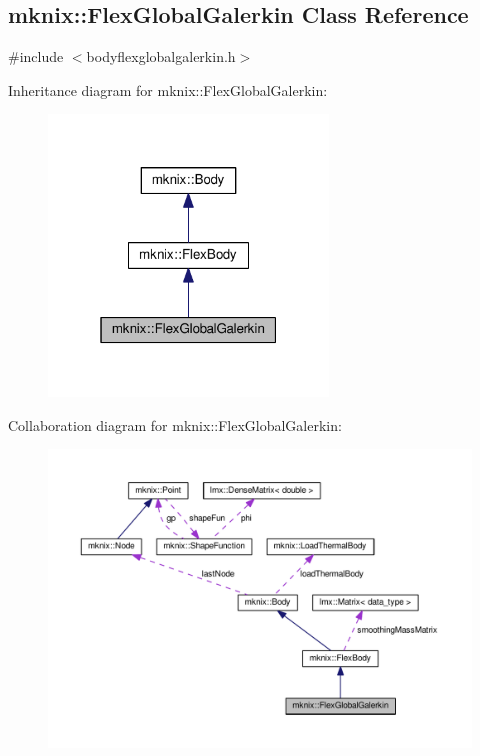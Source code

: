 \hypertarget{classmknix_1_1_flex_global_galerkin}{}\subsection{mknix\+:\+:Flex\+Global\+Galerkin Class Reference}
\label{classmknix_1_1_flex_global_galerkin}


{\ttfamily \#include $<$bodyflexglobalgalerkin.\+h$>$}



Inheritance diagram for mknix\+:\+:Flex\+Global\+Galerkin\+:\nopagebreak
\begin{figure}[H]
\begin{center}
\leavevmode
\includegraphics[width=211pt]{d2/d2f/classmknix_1_1_flex_global_galerkin__inherit__graph}
\end{center}
\end{figure}


Collaboration diagram for mknix\+:\+:Flex\+Global\+Galerkin\+:\nopagebreak
\begin{figure}[H]
\begin{center}
\leavevmode
\includegraphics[width=350pt]{dd/ddb/classmknix_1_1_flex_global_galerkin__coll__graph}
\end{center}
\end{figure}
